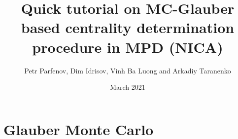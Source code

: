 \documentclass[11pt]{article}
\title{Quick tutorial on MC-Glauber based centrality determination procedure in MPD (NICA)}
\author{Petr Parfenov, Dim Idrisov, Vinh Ba Luong and Arkadiy Taranenko}
\date{March 2021}
\begin{document}
\maketitle

\section{Glauber Monte Carlo}
\end{document}

